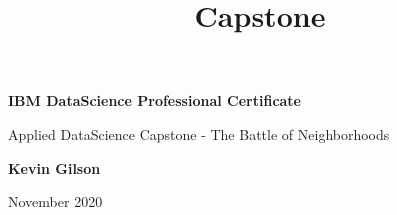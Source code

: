 \documentclass[11pt]{article}
\title{Capstone}
\begin{document}
    
    
\begin{titlepage}
   \begin{center}
       \vspace*{1cm}

       \textbf{IBM DataScience Professional
Certificate}

       \vspace{0.5cm}
        Applied DataScience Capstone - The Battle of
Neighborhoods
            
       \vspace{1.5cm}

       \textbf{Kevin Gilson}

       \vfill
            
       November 2020
            
   \end{center}
\end{titlepage}    

    





\end{document}
